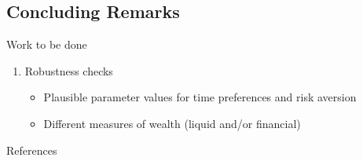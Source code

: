 \documentclass{beamer}
\begin{document}
\subsection{Concluding Remarks}

\begin{frame}{Work to be done}

       \begin{enumerate}
       \item Robustness checks
       \begin{itemize}
      \item Plausible parameter values for time preferences and risk aversion
      \item Different measures of wealth (liquid and/or financial)
      \end{itemize}
      \end{enumerate}

\end{frame}

%




\begin{frame}[allowframebreaks]{References}
  \printbibliography
\end{frame}
\end{document}
